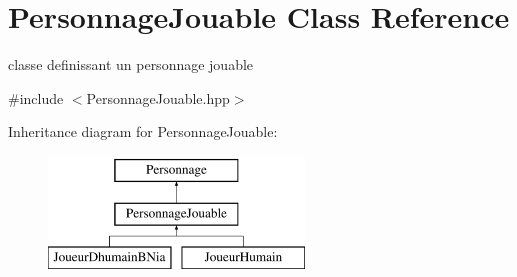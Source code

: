 \hypertarget{classPersonnageJouable}{\section{Personnage\-Jouable Class Reference}
\label{classPersonnageJouable}
}


classe definissant un personnage jouable  




{\ttfamily \#include $<$Personnage\-Jouable.\-hpp$>$}

Inheritance diagram for Personnage\-Jouable\-:\begin{figure}[H]
\begin{center}
\leavevmode
\includegraphics[height=3.000000cm]{classPersonnageJouable}
\end{center}
\end{figure}
